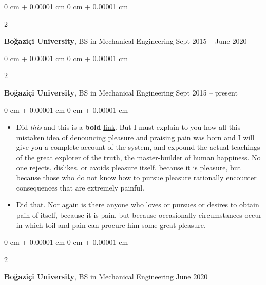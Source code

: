 \documentclass[10pt, letterpaper]{article}
\newenvironment{highlights}{
    \begin{itemize}[
        topsep=0.10 cm,
        parsep=0.10 cm,
        partopsep=0pt,
        itemsep=0pt,
        leftmargin=0 cm + 10pt
    ]
}{
    \end{itemize}
} %
\newenvironment{onecolentry}{
    \begin{adjustwidth}{
        0 cm + 0.00001 cm
    }{
        0 cm + 0.00001 cm
    }
}{
    \end{adjustwidth}
} %
\newenvironment{twocolentry}[2][]{
    \onecolentry
    \def\secondColumn{#2}
    \setcolumnwidth{\fill, 4.5 cm}
    \begin{paracol}{2}
}{
    \switchcolumn \raggedleft \secondColumn
    \end{paracol}
    \endonecolentry
} %
\begin{document}
        \begin{twocolentry}{
            Sept 2015 – June 2020
        }
            \textbf{Boğaziçi University}, BS in Mechanical Engineering\end{twocolentry}



        \vspace{0.2 cm}

        \begin{twocolentry}{
            Sept 2015 – present
        }
            \textbf{Boğaziçi University}, BS in Mechanical Engineering\end{twocolentry}

        \vspace{0.10 cm}
        \begin{onecolentry}
            \begin{highlights}
                \item Did \textit{this} and this is a \textbf{bold} \href{https://example.com}{link}. But I must explain to you how all this mistaken idea of denouncing pleasure and praising pain was born and I will give you a complete account of the system, and expound the actual teachings of the great explorer of the truth, the master-builder of human happiness. No one rejects, dislikes, or avoids pleasure itself, because it is pleasure, but because those who do not know how to pursue pleasure rationally encounter consequences that are extremely painful.
                \item Did that. Nor again is there anyone who loves or pursues or desires to obtain pain of itself, because it is pain, but because occasionally circumstances occur in which toil and pain can procure him some great pleasure.
            \end{highlights}
        \end{onecolentry}


        \vspace{0.2 cm}

        \begin{twocolentry}{
            June 2020
        }
            \textbf{Boğaziçi University}, BS in Mechanical Engineering\end{twocolentry}
\end{document}
